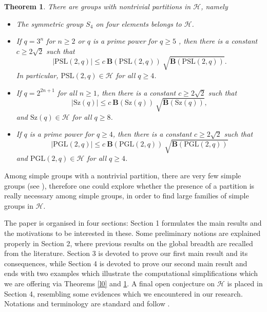 \documentclass{amsart}
\newtheorem{theorem}{Theorem}[section]
\theoremstyle{definition}
\numberwithin{equation}{section}
\begin{document}
\begin{theorem}\label{maintheorem} There are groups with nontrivial partitions in $\mathcal{H}$, namely
\begin{itemize}
\item[{\rm (i)}.] The symmetric group $S_4$ on four elements belongs to $\mathcal{H}$.   
    \item[{\rm(ii)}.] If $q=3^n$ for $n\ge 2$ or $q$ is a prime power for $q\ge 5$ , then there is a constant $c \ge 2 \sqrt{2}$ such that
$$|\mathrm{PSL}(2,q)| \le  c  \ \mathbf{B}(\mathrm{PSL}(2,q)) \ \sqrt{\mathbf{B}(\mathrm{PSL}(2,q))}.$$ In particular, %
$\mathrm{PSL}(2,q) \in  \mathcal{H}$ for all $q \ge 4$. %
    \item[{\rm(iii).}] If $q=2^{2n+1}$ for all $n\ge 1$, then there is a constant $c \ge 2 \sqrt{2}$ such that
$$|\mathrm{Sz}(q)| \le  c  \ \mathbf{B}(\mathrm{Sz}(q)) \ \sqrt{\mathbf{B}(\mathrm{Sz}(q))},$$
and  $\mathrm{Sz}(q) \in  \mathcal{H}$ for all $q \ge 8$. %
\item[{\rm (iv).}] If $q$ is a prime power for $q\ge 4$, then there is a constant $c \ge 2 \sqrt{2}$ such that
$$|\mathrm{PGL}(2,q)| \le  c  \ \mathbf{B}(\mathrm{PGL}(2,q)) \ \sqrt{\mathbf{B}(\mathrm{PGL}(2,q))}$$
  and  $\mathrm{PGL}(2,q) \in  \mathcal{H}$ for all $q \ge 4$.
\end{itemize}

\end{theorem}

Among simple groups with a nontrivial partition,  there are very few simple groups (see \cite [Corollary 3.5.12] {rs}), therefore one could explore whether the presence of a partition is really necessary among simple groups, in order to find large families of simple groups in $\mathcal{H}$.


 
The paper is organised in four sections: Section 1 formulates the main results and the motivations to be interested in these. Some preliminary notions are explained properly in Section 2, where previous results on the global breadth are recalled from the literature. Section 3 is devoted to prove our first main result and its consequences, while Section 4 is devoted to prove our second main result and ends with two examples which illustrate the computational simplifications which we are offering via Theorems \ref{l0} and \ref{maintheorem}. A final   open conjecture on $\mathcal{H}$ is placed in Section 4, resembling some evidences which we encountered in our research. Notations and terminology are standard and follow \cite{huppert, rs}.
\end{document}
